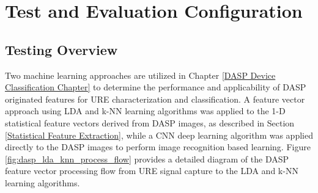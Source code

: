 
\chapter{Test and Evaluation Configuration}
\label{Simulation and Testing Configuration}

\section[Simulation Overview]{Testing Overview}

Two machine learning approaches are utilized in Chapter \ref{DASP Device Classification Chapter} to determine the performance and applicability of DASP originated features for URE characterization and classification.  A feature vector approach using LDA and k-NN learning algorithms was applied to the 1-D statistical feature vectors derived from DASP images, as described in Section \ref{Statistical Feature Extraction}, while a CNN deep learning algorithm was applied directly to the DASP images to perform image recognition based learning. Figure \ref{fig:dasp_lda_knn_process_flow} provides a detailed diagram of the DASP feature vector processing flow from URE signal capture to the LDA and k-NN learning algorithms. 


